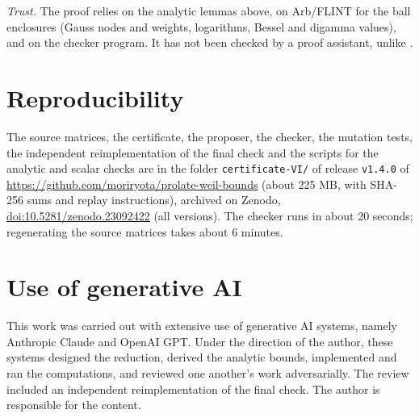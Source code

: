 \documentclass[11pt]{amsart}
\newcommand{\doi}[1]{\href{https://doi.org/#1}{doi:#1}}
\theoremstyle{remark}
\numberwithin{equation}{section}
\begin{document}
\emph{Trust.} The proof relies on the analytic lemmas above, on Arb/FLINT \cite{Arb} for the ball enclosures (Gauss nodes and weights, logarithms, Bessel and digamma values), and on the checker program. It has not been checked by a proof assistant, unlike \cite{MoriLog5}.

\section*{Reproducibility}
The source matrices, the certificate, the proposer, the checker, the mutation tests, the independent reimplementation of the final check and the scripts for the analytic and scalar checks are in the folder \texttt{certificate-VI/} of release \texttt{v1.4.0} of \url{https://github.com/moriryota/prolate-weil-bounds} (about 225 MB, with SHA-256 sums and replay instructions), archived on Zenodo, \doi{10.5281/zenodo.23092422} (all versions). The checker runs in about 20 seconds; regenerating the source matrices takes about 6 minutes.

\section*{Use of generative AI}
This work was carried out with extensive use of generative AI systems, namely Anthropic Claude and OpenAI GPT. Under the direction of the author, these systems designed the reduction, derived the analytic bounds, implemented and ran the computations, and reviewed one another's work adversarially. The review included an independent reimplementation of the final check. The author is responsible for the content.
\end{document}
